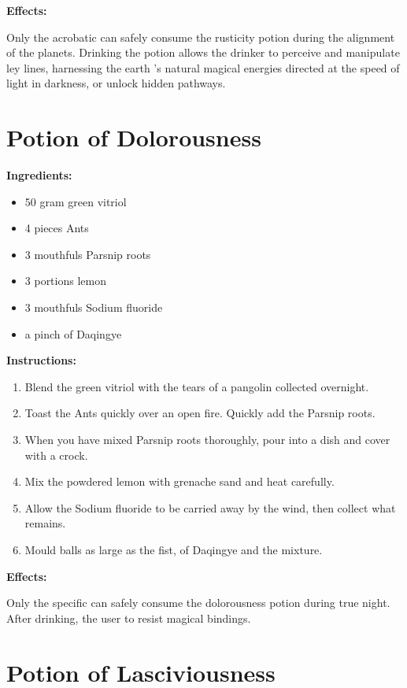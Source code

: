 \documentclass{article}
\begin{document}
\textbf{Effects:}

Only the acrobatic can safely consume the rusticity potion during the alignment of the planets. Drinking the potion allows the drinker to perceive and manipulate ley lines, harnessing the earth 's natural magical energies directed at the speed of light in darkness, or unlock hidden pathways.

\newpage
\section*{Potion of Dolorousness}

\textbf{Ingredients:}

\begin{itemize}
  \item 50 gram green vitriol
  \item 4 pieces Ants
  \item 3 mouthfuls Parsnip roots
  \item 3 portions lemon
  \item 3 mouthfuls Sodium fluoride
  \item a pinch of Daqingye
\end{itemize}

\textbf{Instructions:}

\begin{enumerate}
  \item Blend the green vitriol with the tears of a pangolin collected overnight.
  \item Toast the Ants quickly over an open fire. Quickly add the Parsnip roots.
  \item When you have mixed Parsnip roots thoroughly, pour into a dish and cover with a crock.
  \item Mix the powdered lemon with grenache sand and heat carefully.
  \item Allow the Sodium fluoride to be carried away by the wind, then collect what remains.
  \item Mould balls as large as the fist, of Daqingye and the mixture.
\end{enumerate}

\textbf{Effects:}

Only the specific can safely consume the dolorousness potion during true night. After drinking, the user to resist magical bindings.

\newpage
\section*{Potion of Lasciviousness}
\end{document}

